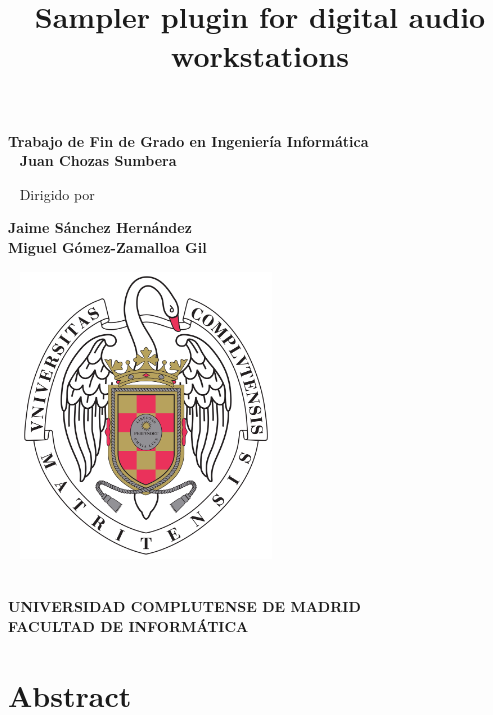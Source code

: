 \documentclass[12pt , a4paper]{article}
\title{\textbf{Sampler plugin for digital audio workstations}}
\date{\vspace{-10ex}}
\begin{document}
	\maketitle
	\begin{center}
		\textbf{Trabajo de Fin de Grado en Ingeniería Informática}\\
		
		~\newline
		\textbf{\large{Juan Chozas Sumbera}}
		
		~\newline
		Dirigido por
		
		\textbf{Jaime Sánchez Hernández\\
		Miguel Gómez-Zamalloa Gil}
		
		
		~\newline
		\includegraphics[width=0.5\textwidth]{logo_UCM.png}\\
		~\newline
		
		\textbf{\large{UNIVERSIDAD COMPLUTENSE DE MADRID}}\\
		
		\textbf{FACULTAD DE INFORMÁTICA}
	\end{center}

	
	
	\newpage
	\tableofcontents
	
	\newpage
	\section{Abstract}
\end{document}

